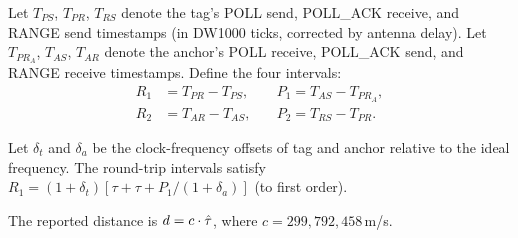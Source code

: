 
Let $T_{PS}$, $T_{PR}$, $T_{RS}$ denote the tag's POLL send, POLL\_ACK receive,
and RANGE send timestamps (in DW1000 ticks, corrected by antenna delay).
Let $T_{PR_A}$, $T_{AS}$, $T_{AR}$ denote the anchor's POLL receive,
POLL\_ACK send, and RANGE receive timestamps.
Define the four intervals:
\begin{align*}
  R_1 &= T_{PR}   - T_{PS},   \quad &P_1 = T_{AS} - T_{PR_A}, \\
  R_2 &= T_{AR}   - T_{AS},   \quad &P_2 = T_{RS} - T_{PR}.
\end{align*}

Let $\delta_t$ and $\delta_a$ be the clock-frequency offsets of tag and anchor
relative to the ideal frequency.
The round-trip intervals satisfy
$R_1 = (1+\delta_t)[\tau + \tau + P_1/(1+\delta_a)]$ (to first order).

The reported distance is $d = c \cdot \hat{\tau}$,
where $c = 299{,}792{,}458$\,m/s.
